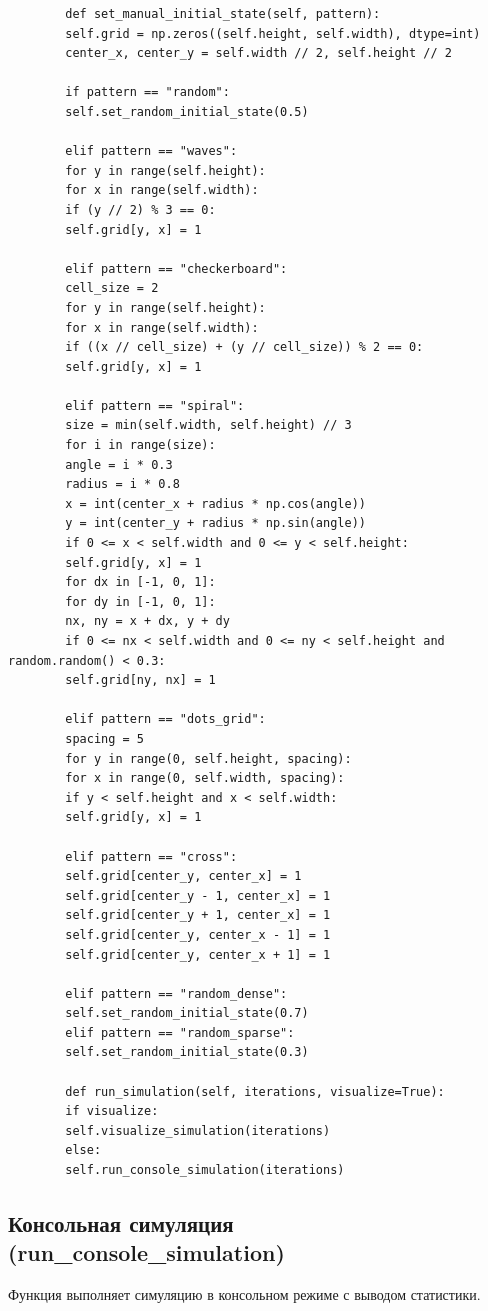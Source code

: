 \documentclass[11pt,a4paper,final]{article}
\begin{document}
	\begin{verbatim}
		def set_manual_initial_state(self, pattern):
		self.grid = np.zeros((self.height, self.width), dtype=int)
		center_x, center_y = self.width // 2, self.height // 2
		
		if pattern == "random":
		self.set_random_initial_state(0.5)
		
		elif pattern == "waves":
		for y in range(self.height):
		for x in range(self.width):
		if (y // 2) % 3 == 0:
		self.grid[y, x] = 1
		
		elif pattern == "checkerboard":
		cell_size = 2
		for y in range(self.height):
		for x in range(self.width):
		if ((x // cell_size) + (y // cell_size)) % 2 == 0:
		self.grid[y, x] = 1
		
		elif pattern == "spiral":
		size = min(self.width, self.height) // 3
		for i in range(size):
		angle = i * 0.3
		radius = i * 0.8
		x = int(center_x + radius * np.cos(angle))
		y = int(center_y + radius * np.sin(angle))
		if 0 <= x < self.width and 0 <= y < self.height:
		self.grid[y, x] = 1
		for dx in [-1, 0, 1]:
		for dy in [-1, 0, 1]:
		nx, ny = x + dx, y + dy
		if 0 <= nx < self.width and 0 <= ny < self.height and random.random() < 0.3:
		self.grid[ny, nx] = 1
		
		elif pattern == "dots_grid":
		spacing = 5
		for y in range(0, self.height, spacing):
		for x in range(0, self.width, spacing):
		if y < self.height and x < self.width:
		self.grid[y, x] = 1
		
		elif pattern == "cross":
		self.grid[center_y, center_x] = 1
		self.grid[center_y - 1, center_x] = 1
		self.grid[center_y + 1, center_x] = 1
		self.grid[center_y, center_x - 1] = 1
		self.grid[center_y, center_x + 1] = 1
		
		elif pattern == "random_dense":
		self.set_random_initial_state(0.7)
		elif pattern == "random_sparse":
		self.set_random_initial_state(0.3)
		
		def run_simulation(self, iterations, visualize=True):
		if visualize:
		self.visualize_simulation(iterations)
		else:
		self.run_console_simulation(iterations)
	\end{verbatim}
	
	\subsection{Консольная симуляция (run\_console\_simulation)}
	
	Функция выполняет симуляцию в консольном режиме с выводом статистики.
	
\end{document}
